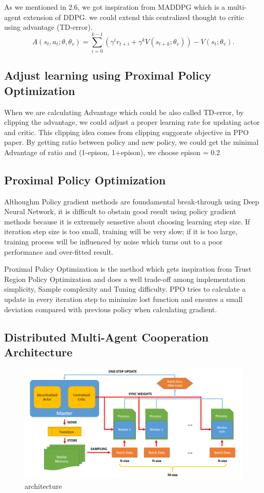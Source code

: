 \documentclass[11pt,twocolumn]{jarticle} %
\begin{document}
As we mentioned in 2.6, we got inspiration from MADDPG which is a multi-agent extension of DDPG. we could extend this centralized thought to critic using advantage (TD-error).
\begin{equation}
A(s_t, a_t; \theta, \theta_v) = \sum_{i=0}^{k-1}(\gamma^i r_{t+i} + \gamma^k V(s_{t+k};\theta_v)) - V(s_t; \theta_v).
\end{equation}
\subsection{Adjust learning using Proximal Policy Optimization}
When we are calculating Advantage which could be also called TD-error, by clipping the advantage, we could adjust a proper learning rate for updating actor and critic. This clipping idea comes from clipping suggorate objective in PPO paper. By getting ratio between policy and new policy, we could get the minimal Advantage of ratio and (1-epison, 1+epison), we choose epison = 0.2

\subsection{Proximal Policy Optimization}
Althoughm Policy gradient methods are foundamental break-through using Deep Neural Network, it is difficult to obstain good result using policy gradient methods because it is extremely sensetive about choosing learning step size. If iteration step size is too small, training will be very slow; if it is too large, training process will be influenced by noise which turns out to a poor performance and over-fitted result. \par
Proximal Policy Optimization is the method which gets inspiration from Trust Region Policy Optimization and does a well trade-off among implementation simplicity, Sample complexity and Tuning difficulty. PPO tries to calculate a update in every iteration step to minimize lost function and ensures a small deviation compared with previous policy when calculating gradient.

\subsection{Distributed Multi-Agent Cooperation Architecture}
\begin{figure}[t]
 \begin{center}
  \includegraphics[width=12cm]{imgs/architecture.PNG}
  \caption{architecture}
  \label{fig:architecture}
 \end{center}
\end{figure}
\end{document}
